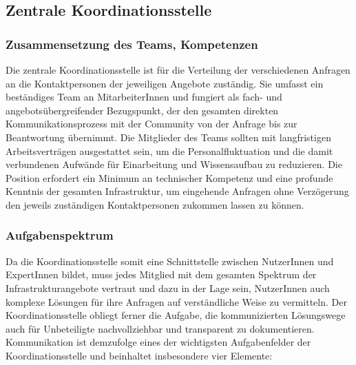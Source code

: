 \documentclass[a4paper,
fontsize=11pt,
oneside,
numbers=noperiodatend,
parskip=half-,
bibliography=totoc,
final
]{scrartcl}
\begin{document}
\hypertarget{zentrale-koordinationsstelle}{%
\subsection{Zentrale
Koordinationsstelle}\label{zentrale-koordinationsstelle}}

\hypertarget{zusammensetzung-des-teams-kompetenzen}{%
\subsubsection{Zusammensetzung des Teams,
Kompetenzen}\label{zusammensetzung-des-teams-kompetenzen}}

Die zentrale Koordinationsstelle ist für die Verteilung der
verschiedenen Anfragen an die Kontaktpersonen der jeweiligen Angebote
zuständig. Sie umfasst ein beständiges Team an MitarbeiterInnen und
fungiert als fach- und angebotsübergreifender Bezugspunkt, der den
gesamten direkten Kommunikationsprozess mit der Community von der
Anfrage bis zur Beantwortung übernimmt. Die Mitglieder des Teams sollten
mit langfristigen Arbeitsverträgen ausgestattet sein, um die
Personalfluktuation und die damit verbundenen Aufwände für Einarbeitung
und Wissensaufbau zu reduzieren. Die Position erfordert ein Minimum an
technischer Kompetenz und eine profunde Kenntnis der gesamten
Infrastruktur, um eingehende Anfragen ohne Verzögerung den jeweils
zuständigen Kontaktpersonen zukommen lassen zu können.

\hypertarget{aufgabenspektrum}{%
\subsubsection{Aufgabenspektrum}\label{aufgabenspektrum}}

Da die Koordinationsstelle somit eine Schnittstelle zwischen NutzerInnen
und ExpertInnen bildet, muss jedes Mitglied mit dem gesamten Spektrum
der Infrastrukturangebote vertraut und dazu in der Lage sein,
NutzerInnen auch komplexe Lösungen für ihre Anfragen auf verständliche
Weise zu vermitteln. Der Koordinationsstelle obliegt ferner die Aufgabe,
die kommunizierten Lösungswege auch für Unbeteiligte nachvollziehbar und
transparent zu dokumentieren. Kommunikation ist demzufolge eines der
wichtigsten Aufgabenfelder der Koordinationsstelle und beinhaltet
insbesondere vier Elemente:
\end{document}
